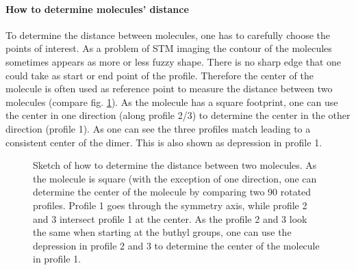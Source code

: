 \paragraph{How to determine molecules' distance}
To determine the distance between molecules, one has to carefully choose the points of interest. As a problem of STM imaging the contour of the molecules sometimes appears as more or less fuzzy shape. There is no sharp edge that one could take as start or end point of the profile. Therefore the center of the molecule is often used as reference point to measure the distance between two molecules (compare fig. \ref{fig:distance-molecules}). As the molecule has a square footprint, one can use the center in one direction (along profile 2/3) to determine the center in the other direction (profile 1). As one can see the three profiles match leading to a consistent center of the dimer. This is also shown as depression in profile 1. 

\begin{figure}[]
	\centering
	 \quad
	\caption{Sketch of how to determine the distance between two molecules. As the molecule is square (with the exception of one direction, one can determine the center of the molecule by comparing two \SI{90}{\deg} rotated profiles. Profile 1 goes through the symmetry axis, while profile 2 and 3 intersect profile 1 at the center. As the profile 2 and 3 look the same when starting at the buthyl groups, one can use the depression in profile 2 and 3 to determine the center of the molecule in profile 1.}
	\label{fig:distance-molecules}
\end{figure}